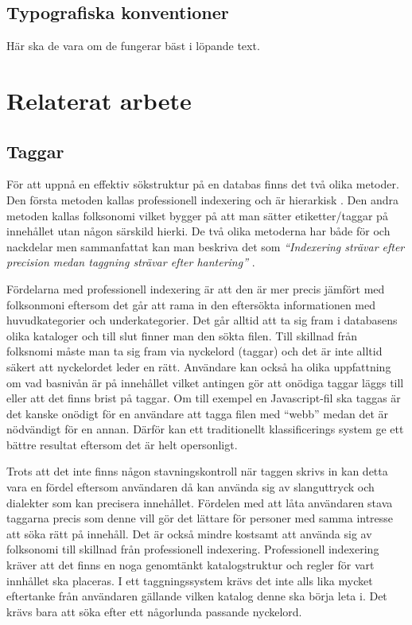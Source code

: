 \documentclass[a4paper,12pt,oneside,final]{extbook}
\begin{document}
\section{Typografiska konventioner}
Här ska de vara om de fungerar bäst i löpande text.

\chapter{Relaterat arbete}

\section{Taggar}
För att uppnå en effektiv sökstruktur på en databas finns det två olika metoder. Den första metoden kallas professionell indexering och är hierarkisk \cite{tagging}. Den andra metoden kallas folksonomi vilket bygger på att man sätter etiketter/taggar på innehållet utan någon särskild hierki\cite{tagging}. De två olika metoderna har både för och nackdelar men sammanfattat kan man beskriva det som \textit{“Indexering strävar efter precision medan taggning strävar efter hantering”} \cite{tagging}.

Fördelarna med professionell indexering är att den är mer precis jämfört med folksonmoni eftersom det går att rama in den eftersökta informationen med huvudkategorier och underkategorier. Det går alltid att ta sig fram i databasens olika kataloger och till slut finner man den sökta filen. Till skillnad från folksnomi måste man ta sig fram via nyckelord (taggar) och det är inte alltid säkert att nyckelordet leder en rätt. Användare kan också ha olika uppfattning om vad basnivån är på innehållet vilket antingen gör att onödiga taggar läggs till eller att det finns brist på taggar. Om till exempel en Javascript-fil ska taggas är det kanske onödigt för en användare att tagga filen med “webb” medan det är nödvändigt för en annan. Därför kan ett traditionellt klassificerings system ge ett bättre resultat eftersom det är helt opersonligt.

Trots att det inte finns någon stavningskontroll när taggen skrivs in kan detta vara en fördel eftersom användaren då kan använda sig av slanguttryck och dialekter som kan precisera innehållet. Fördelen med att låta användaren stava taggarna precis som denne vill gör det lättare för personer med samma intresse att söka rätt på innehåll. Det är också mindre kostsamt att använda sig av folksonomi till skillnad från professionell indexering. Professionell indexering kräver att det finns en noga genomtänkt katalogstruktur och regler för vart innhållet ska placeras. I ett taggningssystem krävs det inte alls lika mycket eftertanke från användaren gällande vilken katalog denne ska börja leta i. Det krävs bara att söka efter ett någorlunda passande nyckelord.
\end{document}
